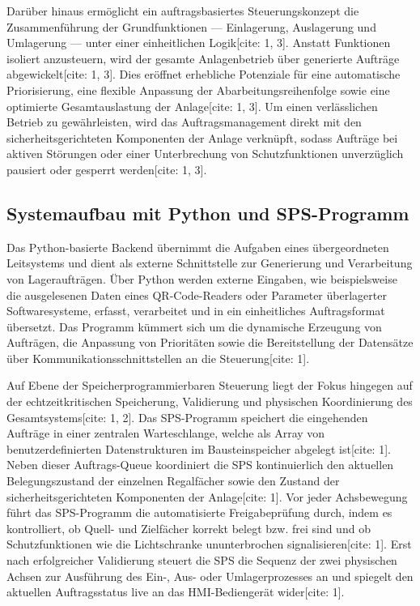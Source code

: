 Darüber hinaus ermöglicht ein auftragsbasiertes Steuerungskonzept die Zusammenführung der Grundfunktionen — Einlagerung, Auslagerung und Umlagerung — unter einer einheitlichen Logik[cite: 1, 3]. Anstatt Funktionen isoliert anzusteuern, wird der gesamte Anlagenbetrieb über generierte Aufträge abgewickelt[cite: 1, 3]. Dies eröffnet erhebliche Potenziale für eine automatische Priorisierung, eine flexible Anpassung der Abarbeitungsreihenfolge sowie eine optimierte Gesamtauslastung der Anlage[cite: 1, 3]. Um einen verlässlichen Betrieb zu gewährleisten, wird das Auftragsmanagement direkt mit den sicherheitsgerichteten Komponenten der Anlage verknüpft, sodass Aufträge bei aktiven Störungen oder einer Unterbrechung von Schutzfunktionen unverzüglich pausiert oder gesperrt werden[cite: 1, 3].

\subsection{Systemaufbau mit Python und SPS-Programm}


Das Python-basierte Backend übernimmt die Aufgaben eines übergeordneten Leitsystems und dient als externe Schnittstelle zur Generierung und Verarbeitung von Lageraufträgen. Über Python werden externe Eingaben, wie beispielsweise die ausgelesenen Daten eines QR-Code-Readers oder Parameter überlagerter Softwaresysteme, erfasst, verarbeitet und in ein einheitliches Auftragsformat übersetzt. Das Programm kümmert sich um die dynamische Erzeugung von Aufträgen, die Anpassung von Prioritäten sowie die Bereitstellung der Datensätze über Kommunikationsschnittstellen an die Steuerung[cite: 1].

Auf Ebene der Speicherprogrammierbaren Steuerung liegt der Fokus hingegen auf der echtzeitkritischen Speicherung, Validierung und physischen Koordinierung des Gesamtsystems[cite: 1, 2]. Das SPS-Programm speichert die eingehenden Aufträge in einer zentralen Warteschlange, welche als Array von benutzerdefinierten Datenstrukturen im Bausteinspeicher abgelegt ist[cite: 1]. Neben dieser Auftrags-Queue koordiniert die SPS kontinuierlich den aktuellen Belegungszustand der einzelnen Regalfächer sowie den Zustand der sicherheitsgerichteten Komponenten der Anlage[cite: 1]. Vor jeder Achsbewegung führt das SPS-Programm die automatisierte Freigabeprüfung durch, indem es kontrolliert, ob Quell- und Zielfächer korrekt belegt bzw. frei sind und ob Schutzfunktionen wie die Lichtschranke ununterbrochen signalisieren[cite: 1]. Erst nach erfolgreicher Validierung steuert die SPS die Sequenz der zwei physischen Achsen zur Ausführung des Ein-, Aus- oder Umlagerprozesses an und spiegelt den aktuellen Auftragsstatus live an das HMI-Bediengerät wider[cite: 1].


